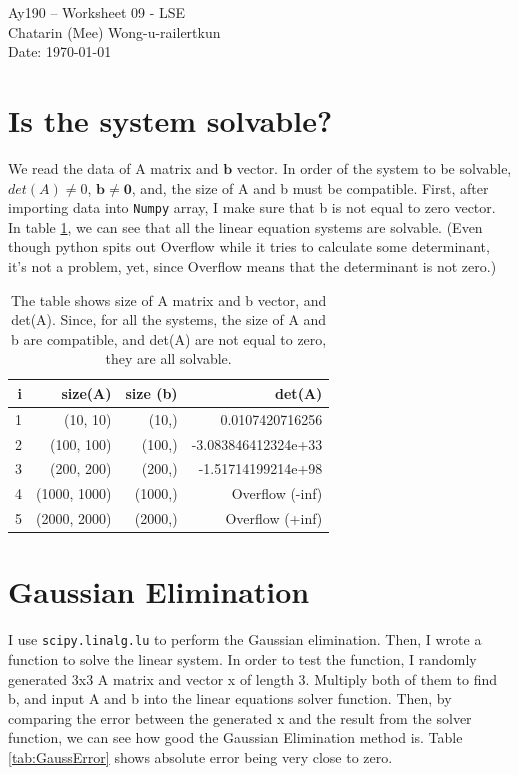 \documentclass[11pt,letterpaper]{article}
\begin{document}
\begin{center}
\Large
Ay190 -- Worksheet 09 - LSE \\    %
Chatarin (Mee) Wong-u-railertkun\\
Date: \today
\end{center}

\section{Is the system solvable?}
We read the data of A matrix and $\mathbf{b}$ vector. In order of the system to be solvable, $det(A) \neq 0$, $\mathbf{b} \neq \mathbf{0}$, and, the size of A and b must be compatible. First, after importing data into \texttt{Numpy} array, I make sure that b is not equal to zero vector. In table \ref{tab:solvable}, we can see that all the linear equation systems are solvable. (Even though python spits out Overflow while it tries to calculate some determinant, it's not a problem, yet, since Overflow means that the determinant is not zero.)

\begin{table}[h!]
	\centering
	\begin{tabular}{r || r | r | r}
		i & size(A) & size (b) & det(A) \\
		\hline
		\hline
		1 & (10, 10) & (10,) & 0.0107420716256 \\
		2 & (100, 100) & (100,) & -3.083846412324e+33 \\
		3 & (200, 200) & (200,) & -1.51714199214e+98 \\
		4 & (1000, 1000) & (1000,) & Overflow (-inf) \\
		5 & (2000, 2000) & (2000,) & Overflow (+inf) \\
		\hline
	\end{tabular}
	\caption{The table shows size of A matrix and b vector, and det(A). Since, for all the systems, the size of A and b are compatible, and det(A) are not equal to zero, they are all solvable.}
	\label{tab:solvable}
\end{table}

\section{Gaussian Elimination}
I use \texttt{scipy.linalg.lu} to perform the Gaussian elimination. Then, I wrote a function to solve the linear system. In order to test the function, I randomly generated 3x3 A matrix and vector x of length 3. Multiply both of them to find b, and input A and b into the linear equations solver function. Then, by comparing the error between the generated x and the result from the solver function, we can see how good the Gaussian Elimination method is. Table \ref{tab:GaussError} shows absolute error being very close to zero.
\end{document}

